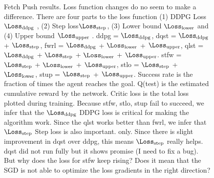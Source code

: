 \begin{figure}
  \caption{
    Fetch Push results. Loss function changes do no seem to make a difference.
    There are four parts to the loss function (1) DDPG Loss $\Loss_{\text{ddpg}}$ ,
    (2) Step loss$\Loss_{\text{step}}$,  
    (3) Lower bound $\Loss_{\text{lower}}$ and
    (4) Upper bound $\Loss_{\text{upper}}$ .
    ddpg = $\Loss_{\text{ddpg}}$,
    dqst = $\Loss_{\text{ddpg}}$ + $\Loss_{\text{step}}$,
    fwrl = $\Loss_{\text{ddpg}}$ + $\Loss_{\text{lower}}$ +
    $\Loss_{\text{upper}}$,
    qlst = $\Loss_{\text{ddpg}}$ + $\Loss_{\text{step}}$ + $\Loss_{\text{lower}}$ + $\Loss_{\text{upper}}$.
    stfw = $\Loss_{\text{step}}$ + $\Loss_{\text{lower}}$ + $\Loss_{\text{upper}}$,
    stlo = $\Loss_{\text{step}}$ + $\Loss_{\text{lower}}$,
    stup = $\Loss_{\text{step}}$ + $\Loss_{\text{upper}}$.
    Success rate is the fraction of times the agent reaches the goal. Q(test) is
    the estimated cumulative reward by the network. Critic loss is the total
    loss plotted during training.
    Because stfw, stlo, stup fail to succeed, we infer that the $\Loss_{\text{ddpg}}$ DDPG loss is
    critical for making the algorithm work. Since the qlst works better than
    fwrl, we infer that $\Loss_{\text{step}}$ Step loss is also important.
    only.
    Since there is slight improvement in dqst over ddpg, this means
    $\Loss_{\text{step}}$ really helps. dqst did not run fully but it shows
    promise (I need to fix a bug).
    But why does the loss for stfw keep rising? Does it mean that the SGD is not
    able to optimize the loss gradients in the right direction?
  }%
  \label{fig:fwrl-stepfwrl-noop-FetchPush}%
\end{figure}%
% 

